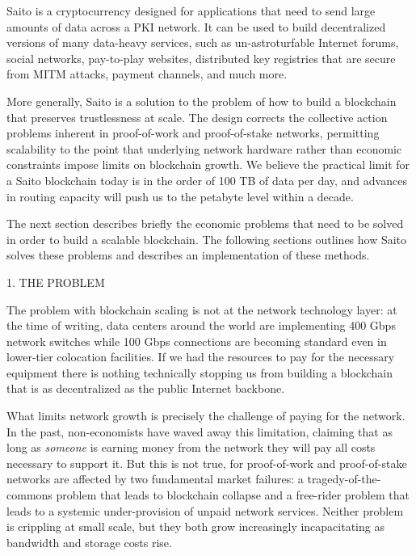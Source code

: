 \documentclass[11pt, oneside]{article}   	%
\begin{document}
\begin{multicols}{2}
Saito is a cryptocurrency designed for applications that need to send large amounts of data across a PKI network. It can be used to build decentralized versions of many data-heavy services, such as un-astroturfable Internet forums, social networks, pay-to-play websites, distributed key registries that are secure from MITM attacks, payment channels, and much more.

More generally, Saito is a solution to the problem of how to build a blockchain that preserves trustlessness at scale. The design corrects the collective action problems inherent in proof-of-work and proof-of-stake networks, permitting scalability to the point that underlying network hardware rather than economic constraints impose limits on blockchain growth. We believe the practical limit for a Saito blockchain today is in the order of 100 TB of data per day, and advances in routing capacity will push us to the petabyte level within a decade.

The next section describes briefly the economic problems that need to be solved in order to build a scalable blockchain. The following sections outlines how Saito solves these problems and describes an implementation of these methods.


1. THE PROBLEM

The problem with blockchain scaling is not at the network technology layer: at the time of writing, data centers around the world are implementing 400 Gbps network switches while 100 Gbps connections are becoming standard even in lower-tier colocation facilities. If we had the resources to pay for the necessary equipment there is nothing technically stopping us from building a blockchain that is as decentralized as the public Internet backbone.

What limits network growth is precisely the challenge of paying for the network. In the past, non-economists have waved away this limitation, claiming that as long as {\textit{someone}} is earning money from the network they will pay all costs necessary to support it. But this is not true, for proof-of-work and proof-of-stake networks are affected by two fundamental market failures:  a tragedy-of-the-commons problem that leads to blockchain collapse and a free-rider problem that leads to a systemic under-provision of unpaid network services. Neither problem is crippling at small scale, but they both grow increasingly incapacitating as bandwidth and storage costs rise.


\end{multicols}
\end{document}
